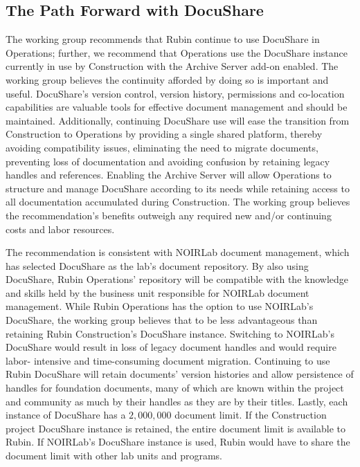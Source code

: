 \subsection{The Path Forward with DocuShare}

The working group recommends that Rubin continue to use DocuShare in Operations; further, we recommend that Operations use the DocuShare instance
currently in use by Construction with the Archive Server add-on enabled. The working group believes the continuity afforded by doing so is important and useful.
DocuShare’s version control, version history, permissions and co-location capabilities are valuable tools for effective document management and should be 
maintained. Additionally, continuing DocuShare use will ease the transition from Construction to Operations by providing a single shared platform, thereby 
avoiding compatibility issues, eliminating the need to migrate documents, preventing loss of documentation and avoiding confusion by retaining legacy handles 
and references. Enabling the Archive Server will allow Operations to structure and manage DocuShare according to its needs while retaining access to all 
documentation accumulated during Construction. The working group believes the recommendation’s benefits outweigh any required new and/or continuing costs 
and labor resources.

The recommendation is consistent with NOIRLab document management, which has selected DocuShare as the lab’s document repository. By also using 
DocuShare, Rubin Operations’ repository will be compatible with the knowledge and skills held by the business unit responsible for NOIRLab document 
management. While Rubin Operations has the option to use NOIRLab’s DocuShare, the working group believes that to be less advantageous than retaining 
Rubin Construction’s DocuShare instance. Switching to NOIRLab’s DocuShare would result in loss of legacy document handles and would require labor-
intensive and time-consuming document migration. Continuing to use Rubin DocuShare will retain documents’ version histories and allow persistence of handles 
for foundation documents, many of which are known within the project and community as much by their handles as they are by their titles. Lastly, each instance 
of DocuShare has a $2,000,000$ document limit. If the Construction project DocuShare instance is retained, the entire document limit is available to Rubin. If 
NOIRLab’s DocuShare instance is used, Rubin would have to share the document limit with other lab units and programs.

